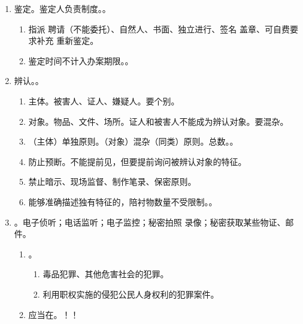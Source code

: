 \begin{enumerate}
        \begin{enumerate}
          \item 邮件电报（通信自由）要经公安 \hz 检批准。。
          \item 本案无关，3 日解除。
        \end{enumerate}
  \item 鉴定。鉴定人负责制度。。
        \begin{enumerate}
          \item 指派 \hz 聘请（不能委托）、自然人、书面、独立进行、签名 \hz 盖章、可自费要求补充 \hz 重新鉴定。
          \item 鉴定时间不计入办案期限。。
        \end{enumerate}
  \item 辨认。。
        \begin{enumerate}
          \item 主体。被害人、证人、嫌疑人。要个别。
          \item 对象。物品、文件、场所。证人和被害人不能成为辨认对象。要混杂。
          \item （主体）单独原则。（对象）混杂（同类）原则。总数。。
          \item 防止预断。不能提前见，但要提前询问被辨认对象的特征。
          \item 禁止暗示、现场监督、制作笔录、保密原则。
          \item 能够准确描述独有特征的，陪衬物数量不受限制。。
        \end{enumerate}
  \item {}。电子侦听；电话监听；电子监控；秘密拍照 \hz 录像；秘密获取某些物证、邮件。
        \begin{enumerate}
          \item {}。
                \begin{enumerate}
                  \item {}毒品犯罪、其他危害社会的犯罪。
                  \item 利用职权实施的侵犯公民人身权利的犯罪案件。
                \end{enumerate}
          \item 应当在。！！
                \begin{enumerate}

\end{enumerate}
\end{enumerate}
\end{enumerate}
